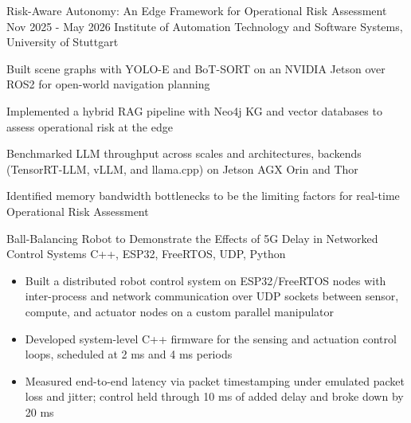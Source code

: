 \documentclass{bmsnkresume}
\begin{document}
\academicsentry
  {Risk-Aware Autonomy: An Edge Framework for Operational Risk Assessment}
  {Nov 2025 - May 2026}
  {}
  {Institute of Automation Technology and Software Systems, University of Stuttgart}
\begin{academicsitems}
  \item Built scene graphs with YOLO-E and BoT-SORT on an NVIDIA Jetson over ROS2 for open-world navigation planning
  \item Implemented a hybrid RAG pipeline with Neo4j KG and vector databases to assess operational risk at the edge
  \item Benchmarked LLM throughput across scales and architectures, backends (TensorRT-LLM, vLLM, and llama.cpp) on Jetson AGX Orin and Thor 
  \item Identified memory bandwidth bottlenecks to be the limiting factors for real-time Operational Risk Assessment
\end{academicsitems}

\newpage

\vspace{0.65em}
\projectentry
  {Ball-Balancing Robot to Demonstrate the Effects of 5G Delay in Networked Control Systems}
  {C++, ESP32, FreeRTOS, UDP, Python}
\begin{itemize}
  \item Built a distributed robot control system on ESP32/FreeRTOS nodes with inter-process and network communication over UDP sockets between sensor, compute, and actuator nodes on a custom parallel manipulator
  \item Developed system-level C++ firmware for the sensing and actuation control loops, scheduled at 2 ms and 4 ms periods
  \item Measured end-to-end latency via packet timestamping under emulated packet loss and jitter; control held through 10 ms of added delay and broke down by 20 ms
\end{itemize}
\vspace{0.37em}
\end{document}
